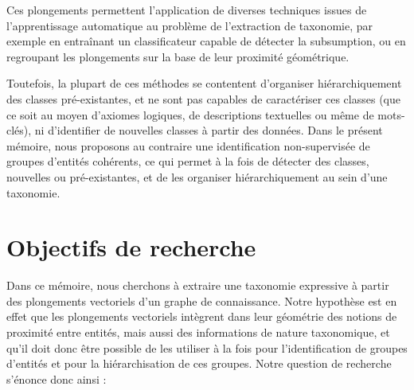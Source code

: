 
Ces plongements permettent l'application de diverses techniques issues de l'apprentissage automatique au problème de l'extraction de taxonomie, par exemple en entraînant un classificateur capable de détecter la subsumption, ou en regroupant les plongements sur la base de leur proximité géométrique.


Toutefois, la plupart de ces méthodes se contentent d'organiser hiérarchiquement des classes pré-existantes, et ne sont pas capables de caractériser ces classes (que ce soit au moyen d'axiomes logiques, de descriptions textuelles ou même de mots-clés), ni d'identifier de nouvelles classes à partir des données.
%
Dans le présent mémoire, nous proposons au contraire une identification non-supervisée de groupes d'entités cohérents, ce qui permet à la fois de détecter des classes, nouvelles ou pré-existantes, et de les organiser hiérarchiquement au sein d'une taxonomie. %




\section{Objectifs de recherche}  %

Dans ce mémoire, nous cherchons à extraire une taxonomie expressive à partir des plongements vectoriels d'un graphe de connaissance.
%
Notre hypothèse est en effet que les plongements vectoriels intègrent dans leur géométrie des notions de proximité entre entités, mais aussi des informations de nature taxonomique, et
%
qu'il doit donc être possible de les utiliser à la fois pour l'identification de groupes d'entités et pour la hiérarchisation de ces groupes. 
%
Notre question de recherche s'énonce donc ainsi :

